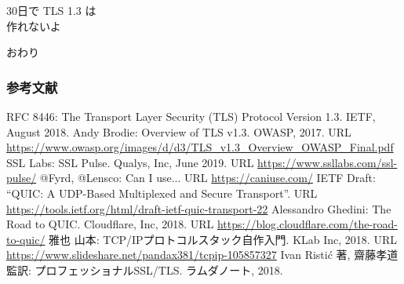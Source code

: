 \documentclass[dvipdfmx, 12pt]{beamer}
\begin{document}
\begin{frame}
  \begin{center}
    \Huge
    30日で TLS 1.3 は\\作れないよ
  \end{center}
\end{frame}

\begin{frame}
  \begin{center}
    \Huge
    おわり
  \end{center}
\end{frame}

\appendix
\begin{frame}[allowframebreaks]
  \frametitle{参考文献}

  \begin{thebibliography}{9}
     RFC 8446: The Transport Layer Security (TLS) Protocol Version 1.3. IETF, August 2018.
     Andy Brodie: Overview of TLS v1.3. OWASP, 2017. URL \url{https://www.owasp.org/images/d/d3/TLS_v1.3_Overview_OWASP_Final.pdf}
     SSL Labs: SSL Pulse. Qualys, Inc, June 2019. URL \url{https://www.ssllabs.com/ssl-pulse/}
     @Fyrd, @Lensco: Can I use... URL \url{https://caniuse.com/}
     IETF Draft: ``QUIC: A UDP-Based Multiplexed and Secure Transport''. URL \url{https://tools.ietf.org/html/draft-ietf-quic-transport-22}
     Alessandro Ghedini: The Road to QUIC. Cloudflare, Inc, 2018. URL \url{https://blog.cloudflare.com/the-road-to-quic/}
     雅也 山本: TCP/IPプロトコルスタック自作入門. KLab Inc, 2018. URL \url{https://www.slideshare.net/pandax381/tcpip-105857327}
     Ivan Ristić 著, 齋藤孝道 監訳: プロフェッショナルSSL/TLS. ラムダノート, 2018.
  \end{thebibliography}

\end{frame}

\end{document}
